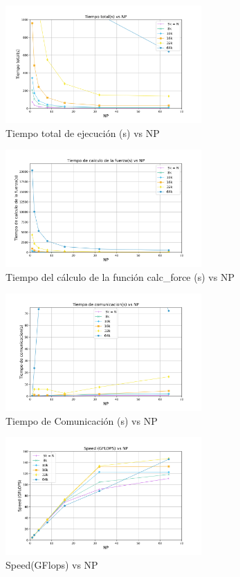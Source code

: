 \documentclass[conference]{IEEEtran}
\begin{document}
\begin{figure}[!ht]
    \centering
    \includegraphics[width =7.5cm]{Images/Tiempo total(s) vs NP.png}
    \caption{Tiempo total de ejecución (s) vs NP}
    \label{fig:my_label}
\end{figure}

\begin{figure}[!ht]
    \centering
    \includegraphics[width =7.5cm]{Images/Tiempo de calculo de la fuerza(s) vs NP.png}
    \caption{Tiempo del cálculo de la función calc\_force (s) vs NP}
    \label{fig:my_label}
\end{figure}

\begin{figure}[!ht]
    \centering
    \includegraphics[width =7.5cm]{Images/Tiempo de comunicacion(s) vs NP.png}
    \caption{Tiempo de Comunicación (s) vs NP}
    \label{fig:my_label}
\end{figure}

\begin{figure}[!ht]
    \centering
    \includegraphics[width =7.5cm]{Images/Speed (GFLOPS) vs NP.png}
    \caption{Speed(GFlops) vs NP}
    \label{fig:my_label}
\end{figure}
\end{document}
